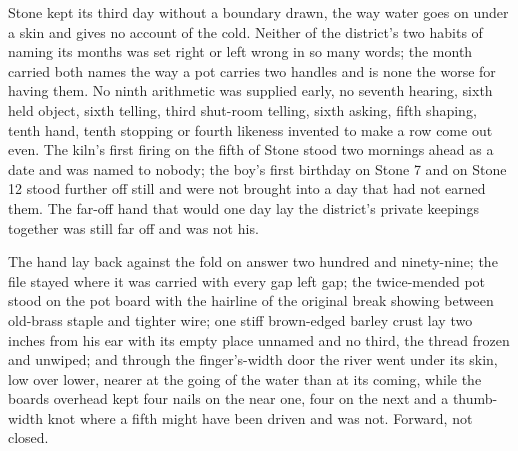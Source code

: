 Stone kept its third day without a boundary drawn, the way water goes on under a skin and gives no account of the cold. Neither of the district's two habits of naming its months was set right or left wrong in so many words; the month carried both names the way a pot carries two handles and is none the worse for having them. No ninth arithmetic was supplied early, no seventh hearing, sixth held object, sixth telling, third shut-room telling, sixth asking, fifth shaping, tenth hand, tenth stopping or fourth likeness invented to make a row come out even. The kiln's first firing on the fifth of Stone stood two mornings ahead as a date and was named to nobody; the boy's first birthday on Stone 7 and  on Stone 12 stood further off still and were not brought into a day that had not earned them. The far-off hand that would one day lay the district's private keepings together was still far off and was not his.

The hand lay back against the fold on answer two hundred and ninety-nine; the file stayed where it was carried with every gap left gap; the twice-mended pot stood on the pot board with the hairline of the original break showing between old-brass staple and tighter wire; one stiff brown-edged barley crust lay two inches from his ear with its empty place unnamed and no third, the thread frozen and unwiped; and through the finger's-width door the river went under its skin, low over lower, nearer at the going of the water than at its coming, while the boards overhead kept four nails on the near one, four on the next and a thumb-width knot where a fifth might have been driven and was not. Forward, not closed.
